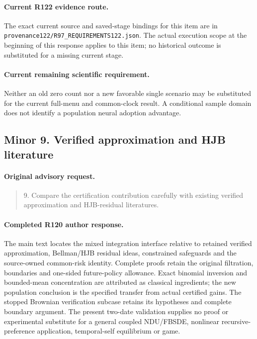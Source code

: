 \paragraph{Current R122 evidence route.}
The exact current source and saved-stage bindings for this item are in \nolinkurl{provenance122/R97_REQUIREMENTS122.json}. The actual execution scope at the beginning of this response applies to this item; no historical outcome is substituted for a missing current stage.
\paragraph{Current remaining scientific requirement.}
Neither an old zero count nor a new favorable single scenario may be substituted for the current full-menu and common-clock result. A conditional sample domain does not identify a population neural adoption advantage.

\subsection{Minor 9. Verified approximation and HJB literature}
\label{response122:minor-9}

\paragraph{Original advisory request.}
\begin{quote}
9. Compare the certification contribution carefully with existing verified approximation and HJB-residual literatures.
\end{quote}

\paragraph{Completed R120 author response.}
The main text locates the mixed integration interface relative to retained verified approximation, Bellman/HJB residual ideas, constrained safeguards and the source-owned common-risk identity. Complete proofs retain the original filtration, boundaries and one-sided future-policy allowance. Exact binomial inversion and bounded-mean concentration are attributed as classical ingredients; the new population conclusion is the specified transfer from actual certified gains. The stopped Brownian verification subcase retains its hypotheses and complete boundary argument. The present two-date validation supplies no proof or experimental substitute for a general coupled NDU/FBSDE, nonlinear recursive-preference application, temporal-self equilibrium or game.


